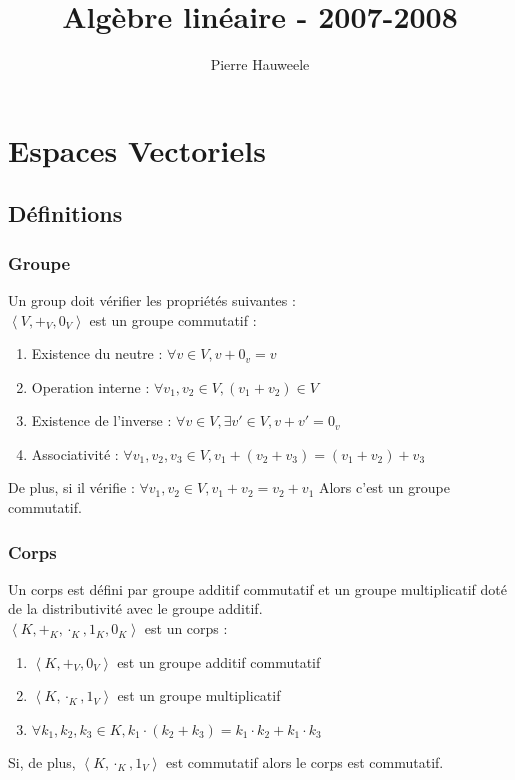 \documentclass[a4paper,10pt]{article}
\author{Pierre Hauweele}
\title{Algèbre linéaire - 2007-2008}
\date{}
\newcommand{\grp}[1]{\left\langle #1 \right\rangle} %
\begin{document}
 \maketitle %
 \tableofcontents
 \newpage

 \section{Espaces Vectoriels}
  \subsection{Définitions}
  \subsubsection{Groupe}
   Un group doit vérifier les propriétés suivantes :\\
   $\grp{V, +_V, 0_V}$ est un groupe commutatif :
   \begin{enumerate}
    \item Existence du neutre : $\forall v \in V, v + 0_v = v$
    \item Operation interne : $\forall v_1, v_2\in V, (v_1 + v_2) \in V$
    \item Existence de l'inverse : $\forall v \in V, \exists v' \in V, v+v' = 0_v$
    \item Associativité : $\forall v_1, v_2, v_3 \in V, v_1 + (v_2 + v_3) = (v_1 + v_2) + v_3$
   \end{enumerate}
   De plus, si il vérifie :
    $\forall v_1, v_2 \in V, v_1 + v_2 = v_2 + v_1$
   Alors c'est un groupe commutatif.

  \subsubsection{Corps}
   Un corps est défini par groupe additif commutatif et un groupe multiplicatif doté de la distributivité avec le groupe additif.\\
   $\grp{K, +_K, \cdot_K, 1_K, 0_K}$ est un corps :
   \begin{enumerate}
    \item $\grp{K, +_V, 0_V}$ est un groupe additif commutatif
    \item $\grp{K, \cdot_K, 1_V}$ est un groupe multiplicatif
    \item $\forall k_1, k_2, k_3 \in K, k_1 \cdot (k_2 + k_3) = k_1 \cdot k_2 + k_1 \cdot k_3$
   \end{enumerate}
   Si, de plus, $\grp{K, \cdot_K, 1_V}$ est commutatif alors le corps est commutatif.
\end{document}
